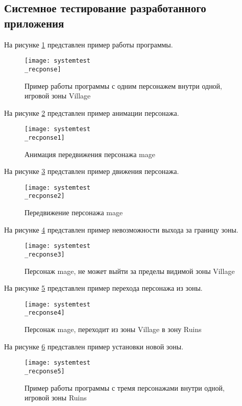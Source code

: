 \subsection{Системное тестирование разработанного приложения}

На рисунке \ref{systemtest_recponse:image} представлен пример работы программы.
\begin{figure}[H]
	\centering
	\texttt{[image: systemtest\\\_recponse]}
	\caption{Пример работы программы с одним персонажем внутри одной, игровой зоны Village}
	\label{systemtest_recponse:image}
\end{figure}

На рисунке \ref{systemtest_recponse1:image} представлен пример анимации персонажа.
\begin{figure}[H]
	\centering
	\texttt{[image: systemtest\\\_recponse1]}
	\caption{Анимация передвижения персонажа mage}
	\label{systemtest_recponse1:image}
\end{figure}

На рисунке \ref{systemtest_recponse2:image} представлен пример движения персонажа.
\begin{figure}[H]
	\centering
	\texttt{[image: systemtest\\\_recponse2]}
	\caption{Передвижение персонажа mage}
	\label{systemtest_recponse2:image}
\end{figure}

На рисунке \ref{systemtest_recponse3:image} представлен пример невозможности выхода за границу зоны.
\begin{figure}[H]
	\centering
	\texttt{[image: systemtest\\\_recponse3]}
	\caption{Персонаж mage, не может выйти за пределы видимой зоны Village}
	\label{systemtest_recponse3:image}
\end{figure}

На рисунке \ref{systemtest_recponse4:image} представлен пример перехода персонажа из зоны.
\begin{figure}[H]
	\centering
	\texttt{[image: systemtest\\\_recponse4]}
	\caption{Персонаж mage, переходит из зоны Village в зону Ruins}
	\label{systemtest_recponse4:image}
\end{figure}

На рисунке \ref{systemtest_recponse5:image} представлен пример установки новой зоны.
\begin{figure}[H]
	\centering
	\texttt{[image: systemtest\\\_recponse5]}
	\caption{Пример работы программы с тремя персонажами внутри одной, игровой зоны Ruins}
	\label{systemtest_recponse5:image}
\end{figure}

